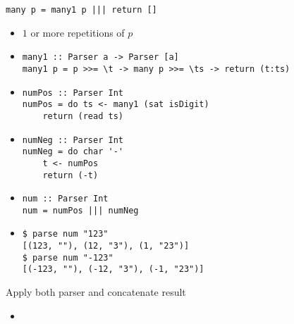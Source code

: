 \begin{itemize}
\begin{itemize}
\begin{itemize}
\begin{verbatim}
many p = many1 p ||| return []
\end{verbatim}
                \end{itemize}
                \begin{itemize}
                    \item $1$ or more repetitions of $p$
                    \item
\begin{verbatim}
many1 :: Parser a -> Parser [a]
many1 p = p >>= \t -> many p >>= \ts -> return (t:ts)
\end{verbatim}
                \end{itemize}
                \begin{itemize}
                    \item
\begin{verbatim}
numPos :: Parser Int
numPos = do ts <- many1 (sat isDigit)
    return (read ts)
\end{verbatim}
                \end{itemize}
                \begin{itemize}
                    \item
\begin{verbatim}
numNeg :: Parser Int
numNeg = do char '-'
    t <- numPos
    return (-t)
\end{verbatim}
                \end{itemize}
                \begin{itemize}
                    \item
\begin{verbatim}
num :: Parser Int
num = numPos ||| numNeg
\end{verbatim}
                    \item
\begin{verbatim}
$ parse num "123"
[(123, ""), (12, "3"), (1, "23")]
$ parse num "-123"
[(-123, ""), (-12, "3"), (-1, "23")]
\end{verbatim}
                \end{itemize}
        \end{itemize}
        \begin{itemize}
             Apply both parser and concatenate result
                \begin{itemize}
                    \item
\begin{verbatim}

\end{verbatim}
\end{itemize}
\end{itemize}
\end{itemize}
